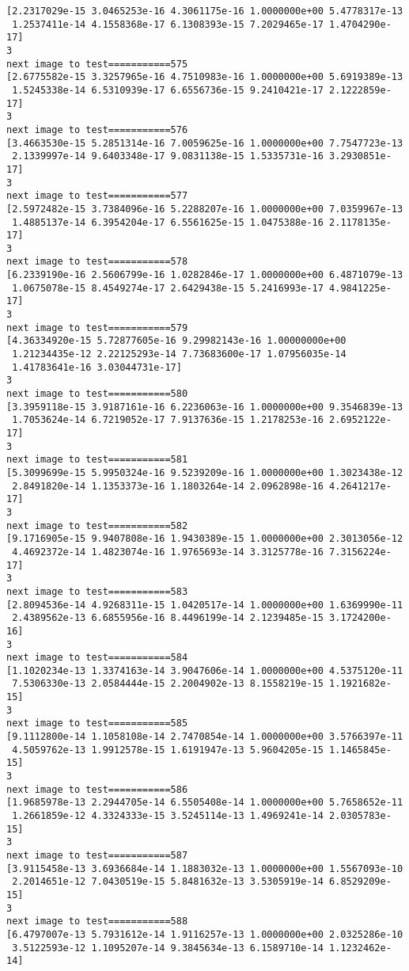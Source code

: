 \documentclass[11pt]{article}
\begin{document}
\begin{Verbatim}[commandchars=\\\{\}]
[2.2317029e-15 3.0465253e-16 4.3061175e-16 1.0000000e+00 5.4778317e-13
 1.2537411e-14 4.1558368e-17 6.1308393e-15 7.2029465e-17 1.4704290e-17]
3
next image to test===========575
[2.6775582e-15 3.3257965e-16 4.7510983e-16 1.0000000e+00 5.6919389e-13
 1.5245338e-14 6.5310939e-17 6.6556736e-15 9.2410421e-17 2.1222859e-17]
3
next image to test===========576
[3.4663530e-15 5.2851314e-16 7.0059625e-16 1.0000000e+00 7.7547723e-13
 2.1339997e-14 9.6403348e-17 9.0831138e-15 1.5335731e-16 3.2930851e-17]
3
next image to test===========577
[2.5972482e-15 3.7384096e-16 5.2288207e-16 1.0000000e+00 7.0359967e-13
 1.4885137e-14 6.3954204e-17 6.5561625e-15 1.0475388e-16 2.1178135e-17]
3
next image to test===========578
[6.2339190e-16 2.5606799e-16 1.0282846e-17 1.0000000e+00 6.4871079e-13
 1.0675078e-15 8.4549274e-17 2.6429438e-15 5.2416993e-17 4.9841225e-17]
3
next image to test===========579
[4.36334920e-15 5.72877605e-16 9.29982143e-16 1.00000000e+00
 1.21234435e-12 2.22125293e-14 7.73683600e-17 1.07956035e-14
 1.41783641e-16 3.03044731e-17]
3
next image to test===========580
[3.3959118e-15 3.9187161e-16 6.2236063e-16 1.0000000e+00 9.3546839e-13
 1.7053624e-14 6.7219052e-17 7.9137636e-15 1.2178253e-16 2.6952122e-17]
3
next image to test===========581
[5.3099699e-15 5.9950324e-16 9.5239209e-16 1.0000000e+00 1.3023438e-12
 2.8491820e-14 1.1353373e-16 1.1803264e-14 2.0962898e-16 4.2641217e-17]
3
next image to test===========582
[9.1716905e-15 9.9407808e-16 1.9430389e-15 1.0000000e+00 2.3013056e-12
 4.4692372e-14 1.4823074e-16 1.9765693e-14 3.3125778e-16 7.3156224e-17]
3
next image to test===========583
[2.8094536e-14 4.9268311e-15 1.0420517e-14 1.0000000e+00 1.6369990e-11
 2.4389562e-13 6.6855956e-16 8.4496199e-14 2.1239485e-15 3.1724200e-16]
3
next image to test===========584
[1.1020234e-13 1.3374163e-14 3.9047606e-14 1.0000000e+00 4.5375120e-11
 7.5306330e-13 2.0584444e-15 2.2004902e-13 8.1558219e-15 1.1921682e-15]
3
next image to test===========585
[9.1112800e-14 1.1058108e-14 2.7470854e-14 1.0000000e+00 3.5766397e-11
 4.5059762e-13 1.9912578e-15 1.6191947e-13 5.9604205e-15 1.1465845e-15]
3
next image to test===========586
[1.9685978e-13 2.2944705e-14 6.5505408e-14 1.0000000e+00 5.7658652e-11
 1.2661859e-12 4.3324333e-15 3.5245114e-13 1.4969241e-14 2.0305783e-15]
3
next image to test===========587
[3.9115458e-13 3.6936684e-14 1.1883032e-13 1.0000000e+00 1.5567093e-10
 2.2014651e-12 7.0430519e-15 5.8481632e-13 3.5305919e-14 6.8529209e-15]
3
next image to test===========588
[6.4797007e-13 5.7931612e-14 1.9116257e-13 1.0000000e+00 2.0325286e-10
 3.5122593e-12 1.1095207e-14 9.3845634e-13 6.1589710e-14 1.1232462e-14]

\end{Verbatim}
\end{document}
